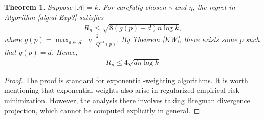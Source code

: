 \documentclass[letterpaper,11pt,openright,openany]{book}
\numberwithin{equation}{section}
\theoremstyle{plain}
\newtheorem{Th}{Theorem}[section]
\theoremstyle{definition}
\begin{document}
\begin{Th}\label{alb:Th1}
Suppose $|\mathcal A|=k$. For carefully chosen $\gamma$ and $\eta$, the regret in Algorithm \ref{alg:al-Exp3} satisfies
\begin{align*}
R_n\leq\sqrt{8(g(p)+d)n\log k},
\end{align*}
where $g(p)=\max_{a\in\mathcal A}||a||^2_{Q^{-1}(p)}$. By Theorem \ref{KW}, there exists some $p$ such that $g(p)=d$. Hence,
\begin{align*}
R_n\leq 4\sqrt{dn\log k}
\end{align*}
\end{Th}
\begin{proof}
The proof is standard for exponential-weighting algorithms. It is worth mentioning that exponential weights also arise in regularized empirical risk minimization. However, the analysis there involves taking Bregman divergence projection, which cannot be computed explicitly in general.  


\end{proof}
\end{document}
